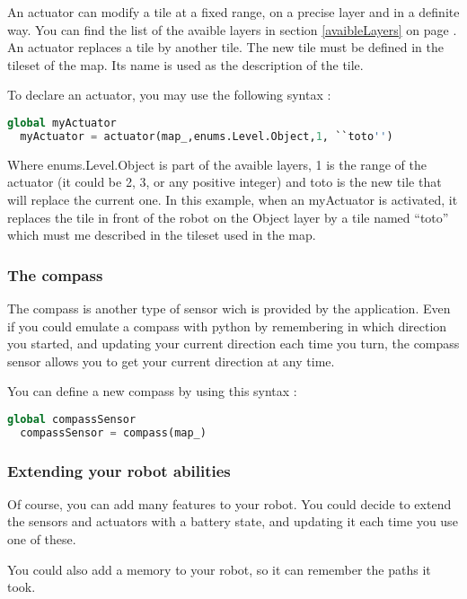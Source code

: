 \documentclass[a4paper,11pt]{article}
\begin{document}
An actuator can modify a tile at a fixed range, on a precise layer and
in a definite way. You can find the list of the avaible layers in
section \ref{avaibleLayers} on page \pageref{avaibleLayers}. An actuator replaces a tile by another
tile. The new tile must be defined in the tileset of the map. Its name
is used as the description of the tile.

To declare an actuator, you may use the following syntax :

\begin{lstlisting}[language=Python]
  global myActuator
  myActuator = actuator(map_,enums.Level.Object,1, ``toto'')
\end{lstlisting}

Where enums.Level.Object is part of the avaible layers, 1 is the range
of the actuator (it could be 2, 3, or any positive integer) and toto
is the new tile that will replace the current one. In this example,
when an myActuator is activated, it replaces the tile in front of the
robot on the Object layer by a tile named ``toto'' which must me
described in the tileset used in the map.


\subsubsection{The compass}

The compass is another type of sensor wich is provided by the
application. Even if you could emulate a compass with python by
remembering in which direction you started, and updating your current
direction each time you turn, the compass sensor allows you to get
your current direction at any time.

You can define a new compass by using this syntax :

\begin{lstlisting}[language=Python]
  global compassSensor
  compassSensor = compass(map_)
\end{lstlisting}


\subsubsection{Extending your robot abilities}

Of course, you can add many features to your robot. You could decide
to extend the sensors and actuators with a battery state, and updating
it each time you use one of these.

You could also add a memory to your robot, so it can remember the
paths it took.
\end{document}
